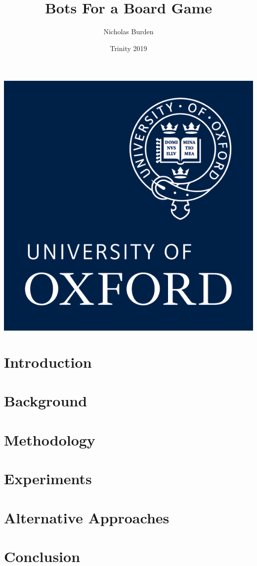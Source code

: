 \documentclass{article}
\title{Bots For a Board Game}
\author{Nicholas Burden}
\date{Trinity 2019}
\begin{document}
\maketitle
\thispagestyle{empty}
\vfill
\vfill
\begin{center}
    \includegraphics[scale=0.2]{images/ox_logo.png}
\end{center}

\newpage


\begin{abstract}
    
\end{abstract}
\newpage
\tableofcontents
\newpage
\section{Introduction}


\section{Background}


\section{Methodology}


\section{Experiments}


\section{Alternative Approaches}


\section{Conclusion}




\end{document}

